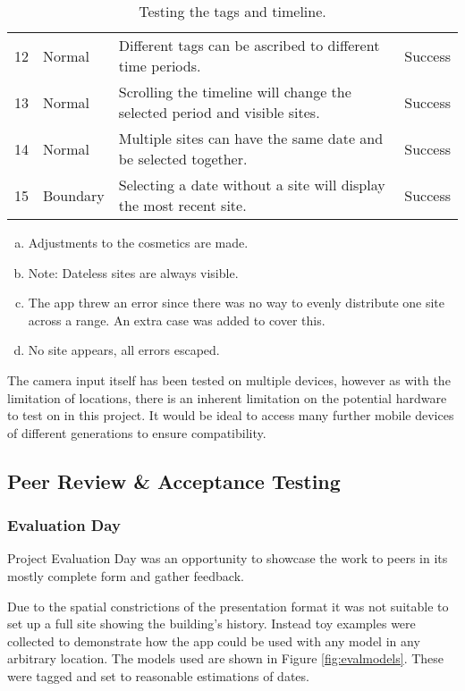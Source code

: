 \documentclass[12pt, a4paper]{article}
\begin{document}
\begin{table}[H]
\begin{tabular}{llll}
12         & Normal        & Different tags can be ascribed to different time periods.                  & Success                               \\
13         & Normal        & Scrolling the timeline will change the selected period and visible sites.  & Success                               \\
14         & Normal        & Multiple sites can have the same date and be selected together.            & Success                               \\
15         & Boundary      & Selecting a date without a site will display the most recent site.         & Success                              
\end{tabular}
\caption{Testing the tags and timeline.}
\end{table}
\begin{enumerate}[(a)]
    \item Adjustments to the cosmetics are made.
    \item Note: Dateless sites are always visible.
    \item The app threw an error since there was no way to evenly distribute one site across a range. An extra case was added to cover this.
    \item No site appears, all errors escaped.
\end{enumerate}

The camera input itself has been tested on multiple devices, however as with the limitation of locations, there is an inherent limitation on the potential hardware to test on in this project. It would be ideal to access many further mobile devices of different generations to ensure compatibility.

\subsection{Peer Review \& Acceptance Testing}

\subsubsection{Evaluation Day}
Project Evaluation Day was an opportunity to showcase the work to peers in its mostly complete form and gather feedback. 

Due to the spatial constrictions of the presentation format it was not suitable to set up a full site showing the building's history. Instead toy examples were collected to demonstrate how the app could be used with any model in any arbitrary location. The models used are shown in Figure \ref{fig:evalmodels}. These were tagged and set to reasonable estimations of dates. 
\end{document}
